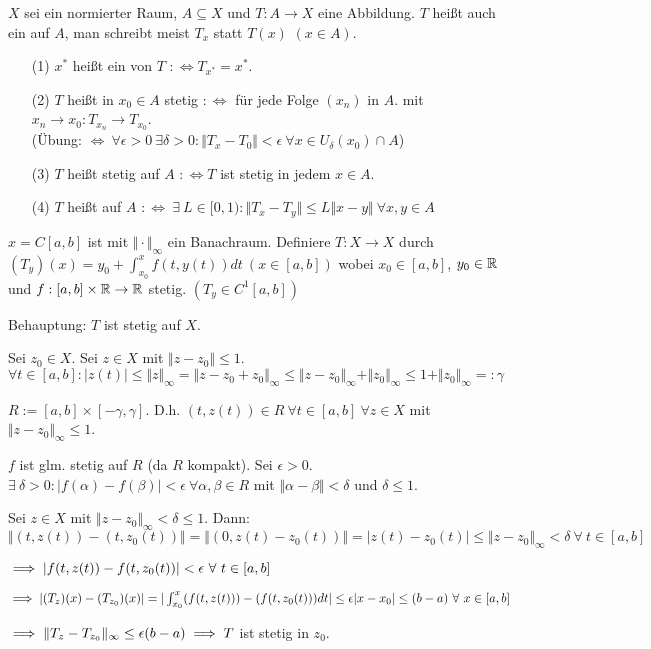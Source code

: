 \documentclass[a4paper,twoside,DIV15,BCOR12mm]{scrbook}
\begin{document}
\begin{definition}[Operator]
 $X$ sei ein normierter Raum, $A \subseteq X$ und $T: A \to X$ eine Abbildung. $T$ heißt auch ein  auf $A$, man schreibt meist $T_x$ statt $T(x)$ $(x \in A)$.
\begin{itemize}
	\item[(1)] $x^*$ heißt ein  von $T$ $: \Leftrightarrow T_{x^*} = x^*$.
	\item[(2)] $T$ heißt in $x_0 \in A$ stetig $: \Leftrightarrow $ für jede Folge $(x_n)$ in 
	$A$. mit $x_n \to x_0: T_{x_n} \to T_{x_0}$. \\
	(Übung: $\Leftrightarrow\ \forall \epsilon > 0 \ \exists \delta > 0: \Vert T_x - T_0 \Vert <
	\epsilon\ \forall x \in U_{\delta}(x_0) \cap A$)
	\item[(3)] $T$ heißt stetig auf $A$ $: \Leftrightarrow T$ ist stetig in jedem $x \in A$.
	\item[(4)] $T$ heißt auf $A$  $: \Leftrightarrow\ \exists \ L \in
	[0,1): \Vert T_x - T_y \Vert \le L \Vert x-y \Vert\ \forall x,y \in A$
\end{itemize}
\end{definition}

\begin{beispiel}[Wichtig!]
$x=C[a,b]$  ist mit $\Vert \cdot \Vert_{\infty}$ ein Banachraum. Definiere $T: X \to X$ durch $(T_y)(x) = y_0 + \int_{x_0}^xf(t,y(t))dt \ (x \in [a,b])$ wobei $x_0 \in [a,b]$, $y_0 \in \mathbb{R}$ und $f:[a,b] \times \mathbb{R} \to \mathbb{R}$ stetig. $(T_y \in C^1[a,b])$

Behauptung: $T$ ist stetig auf $X$.
\end{beispiel}
\begin{beweis}
Sei $z_0 \in X$. Sei $z \in X$ mit $\Vert z - z_0 \Vert \le 1$. $\forall t \in [a,b]: |z(t)| \le \Vert z \Vert_{\infty} = \Vert z - z_0 + z_0 \Vert _{\infty} \le \Vert z - z_0 \Vert _{\infty} + \Vert z_0 \Vert_{\infty} \le 1 + \Vert z_0 \Vert _{\infty} =: \gamma$

$R:= [a,b] \times [-\gamma, \gamma]$. D.h. $(t,z(t)) \in R\ \forall t \in [a,b]\ \forall z \in X$ mit $\Vert z - z_0 \Vert _{\infty} \le 1$.

$f$ ist glm. stetig auf $R$ (da $R$ kompakt). Sei $\epsilon > 0$. $\exists \ \delta > 0: | f(\alpha) - f(\beta) | < \epsilon\ \forall \alpha, \beta \in R$ mit $\Vert \alpha - \beta \Vert < \delta$ und $\delta \le 1$.

Sei $z \in X$ mit $\Vert z - z_0 \Vert_{\infty} < \delta \le 1$. Dann: $\Vert(t,z(t)) - (t,z_0(t)) \Vert = \Vert (0, z(t) - z_0(t)) \Vert = | z(t) - z_0(t) | \le \Vert z - z_0 \Vert_{\infty} < \delta \ \forall \ t \in [a,b]$

$\implies |f(t,z(t)) - f(t,z_0(t))| < \epsilon \ \forall \ t \in [a,b]$

$\implies |(T_z)(x) - (T_{z_0})(x)| = | \int_{x_0}^x (f(t,z(t))) - (f(t,z_0(t))) dt | \le \epsilon |x-x_0| \le (b-a)\ \forall \ x \in [a,b]$

$\implies \Vert T_z - T_{z_0} \Vert_{\infty} \le \epsilon(b-a) \implies T$ ist stetig in $z_0$.
\end{beweis}
\end{document}
